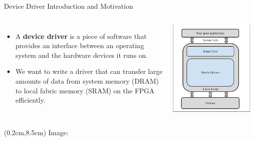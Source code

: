 \documentclass[aspectratio=169,xcolor=dvipsnames]{beamer}
\begin{document}
\begin{frame}{Device Driver Introduction and Motivation}

    \begin{columns}
        \begin{itemize}
            \item A \textbf{device driver} is a piece of software that provides an interface between an operating system and the hardware devices it runs on.
            \item We want to write a driver that can transfer large amounts of data from system memory (DRAM) to local fabric memory (SRAM) on the FPGA efficiently.
        \end{itemize}
        \includegraphics[scale=0.6]{kerneltree.png}
    \end{columns}

    \begin{textblock*}{5cm}(0.2cm,8.5cm)
        \tiny Image: \cite{kernel-tree}
    \end{textblock*}

\end{frame}
\end{document}
